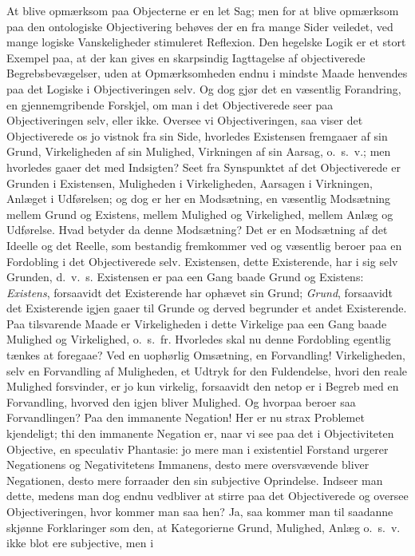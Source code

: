 \documentclass[12pt]{book}
\newcommand{\opage}[1]{\marginnote{\footnotesize\textit{[#1]}}}
\begin{document}
At blive opmærksom paa Objecterne er en let Sag; men for at blive opmærksom paa den ontologiske
Objectivering behøves der en fra mange Sider veiledet, ved mange logiske Vanskeligheder stimuleret
Reflexion. Den hegelske Logik er et stort Exempel paa, at der kan gives en skarpsindig Iagttagelse af
objectiverede Begrebsbevægelser, uden at Opmærksomheden endnu i mindste Maade henvendes paa det Logiske
i Objectiveringen selv. Og dog gjør det en væsentlig Forandring, en gjennemgribende Forskjel, om man i
det Objectiverede seer paa Objectiveringen selv, eller ikke. Oversee vi Objectiveringen, saa viser det
Objectiverede os jo vistnok fra sin Side, hvorledes Existensen fremgaaer af sin Grund, Virkeligheden af
sin Mulighed, Virkningen af sin Aarsag, o.\ s.\ v.; men hvorledes gaaer det med Indsigten? Seet fra
Synspunktet af det Objectiverede er Grunden i Existensen, Muligheden i Virkeligheden, Aarsagen i
Virkningen, Anlæget i Udførelsen; og dog er her en Modsætning, en væsentlig Modsætning mellem Grund og
Existens, mellem Mulighed og Virkelighed, mellem Anlæg og Udførelse. Hvad betyder da denne Modsætning?
Det er en Modsætning af det Ideelle og det Reelle, som bestandig fremkommer ved og væsentlig beroer paa
en Fordobling i det Objectiverede selv. Existensen, dette Existerende, har i sig selv Grunden,
d.\ v.\ s. Existensen er paa een Gang baade Grund og Existens: \emph{Existens}, forsaavidt det
Existerende har ophævet sin Grund; \emph{Grund}, forsaavidt
\opage{271} det Existerende igjen gaaer til Grunde og derved begrunder et andet Existerende. Paa tilsvarende Maade
er Virkeligheden i dette Virkelige paa een Gang baade Mulighed og Virkelighed, o.\ s.\ fr. Hvorledes
skal nu denne Fordobling egentlig tænkes at foregaae? Ved en uophørlig Omsætning, en Forvandling!
Virkeligheden, selv en Forvandling af Muligheden, et Udtryk for den Fuldendelse, hvori den reale
Mulighed forsvinder, er jo kun virkelig, forsaavidt den netop er i Begreb med en Forvandling, hvorved
den igjen bliver Mulighed. Og hvorpaa beroer saa Forvandlingen? Paa den immanente Negation! Her er nu
strax Problemet kjendeligt; thi den immanente Negation er, naar vi see paa det i Objectiviteten
Objective, en speculativ Phantasie: jo mere man i existentiel Forstand urgerer Negationens og
Negativitetens Immanens, desto mere oversvævende bliver Negationen, desto mere forraader den sin
subjective Oprindelse. Indseer man dette, medens man dog endnu vedbliver at stirre paa det Objectiverede
og oversee Objectiveringen, hvor kommer man saa hen? Ja, saa kommer man til saadanne skjønne
Forklaringer som den, at Kategorierne Grund, Mulighed, Anlæg o.\ s.\ v. ikke blot ere subjective, men i
\end{document}
